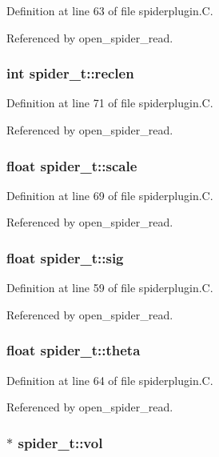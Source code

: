 Definition at line 63 of file spiderplugin.C.

Referenced by open\_\-spider\_\-read.
\subsubsection{\setlength{\rightskip}{0pt plus 5cm}int spider\_\-t::reclen}\label{structspider__t_m24}




Definition at line 71 of file spiderplugin.C.

Referenced by open\_\-spider\_\-read.
\subsubsection{\setlength{\rightskip}{0pt plus 5cm}float spider\_\-t::scale}\label{structspider__t_m22}




Definition at line 69 of file spiderplugin.C.

Referenced by open\_\-spider\_\-read.
\subsubsection{\setlength{\rightskip}{0pt plus 5cm}float spider\_\-t::sig}\label{structspider__t_m12}




Definition at line 59 of file spiderplugin.C.

Referenced by open\_\-spider\_\-read.
\subsubsection{\setlength{\rightskip}{0pt plus 5cm}float spider\_\-t::theta}\label{structspider__t_m17}




Definition at line 64 of file spiderplugin.C.

Referenced by open\_\-spider\_\-read.
\subsubsection{$\ast$ spider\_\-t::vol}\label{structspider__t_m2}




